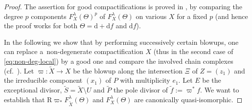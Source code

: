 \documentclass[11pt]{article}
\newcommand{\de}{\mathrm{d}}
\newcommand{\ddRH}{\Theta}
\newcommand{\cpt}{compactification}
\newcommand{\RD}{\mathrm{R}}
\begin{document}
\begin{proof} The assertion for good {\cpt}s is proved in \cite[Theorem~1.7]{Y}, by comparing the degree $p$ components $F_X^\lambda(\ddRH)^p$ of $F_X^\lambda(\ddRH)$ on various $X$ for a fixed $p$ (and hence the proof works for both $\ddRH = \de +\de f$ and $\de f$).

In the following we show that by performing successively certain blowups, one can replace a~non-degenerate {\cpt} $X$ (thus in the second case of \eqref{eq:non-deg-local}) by a good one and compare the involved chain complexes (cf.~\cite[Section~4($b$)]{Y}). Let $\varpi \colon \widetilde{X} \to X$ be the blowup along the intersection $\Xi$ of $Z = (z_1)$ and the irreducible component $(x_1)$ of $P$ with multiplicity $e_1$. Let $E$ be the exceptional divisor, $\widetilde{S} = \widetilde{X}\setminus U$ and $\widetilde{P}$ the pole divisor of $\tilde{f} := \varpi^*f$. We want to establish that $\RD\varpi_*F_{\widetilde{X}}^\lambda(\ddRH)$ and $F_X^\lambda(\ddRH)$ are canonically quasi-isomorphic.


\end{proof}
\end{document}
